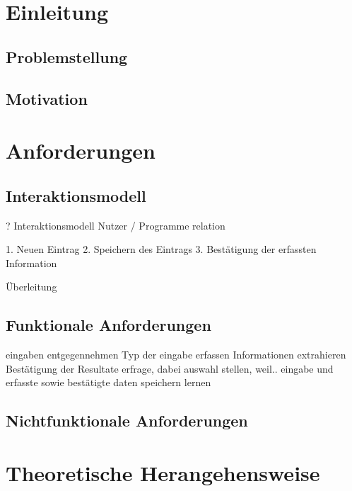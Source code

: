 \chapter{Einleitung}
\section{Problemstellung}
\section{Motivation}

\chapter{Anforderungen}
\section{Interaktionsmodell}
? Interaktionsmodell
Nutzer / Programme relation

1. Neuen Eintrag
2. Speichern des Eintrags
3. Bestätigung der erfassten Information

Überleitung
\section{Funktionale Anforderungen}
eingaben entgegennehmen
Typ der eingabe erfassen
Informationen extrahieren
Bestätigung der Resultate erfrage, dabei auswahl stellen, weil..
eingabe und erfasste sowie bestätigte daten speichern
lernen
\section{Nichtfunktionale Anforderungen}


\chapter{Theoretische Herangehensweise}
